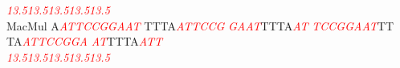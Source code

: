 \documentclass[11pt,twoside,reqno,a4paper]{article}
\begin{document}
{\hspace*{7\charwidth}\hspace*{1\charwidth}\textit{\textcolor{red}{13.5}}\hspace*{1\charwidth}\hspace*{10\charwidth}\textit{\textcolor{red}{13.5}}\hspace*{1\charwidth}\hspace*{10\charwidth}\textit{\textcolor{red}{13.5}}\hspace*{1\charwidth}\hspace*{1\charwidth}\hspace*{10\charwidth}\textit{\textcolor{red}{13.5}}\hspace*{1\charwidth}\hspace*{10\charwidth}\textit{\textcolor{red}{13.5}}\hspace*{1\charwidth}\\
MacMul	A\textit{\textcolor{red}{A}}\textit{\textcolor{red}{T}}\textit{\textcolor{red}{T}}\textit{\textcolor{red}{C}}\textit{\textcolor{red}{C}}\textit{\textcolor{red}{G}}\textit{\textcolor{red}{G}}\textit{\textcolor{red}{A}}\textit{\textcolor{red}{A}}\textit{\textcolor{red}{T}}	TTTA\textit{\textcolor{red}{A}}\textit{\textcolor{red}{T}}\textit{\textcolor{red}{T}}\textit{\textcolor{red}{C}}\textit{\textcolor{red}{C}}\textit{\textcolor{red}{G}}	\textit{\textcolor{red}{G}}\textit{\textcolor{red}{A}}\textit{\textcolor{red}{A}}\textit{\textcolor{red}{T}}TTTA\textit{\textcolor{red}{A}}\textit{\textcolor{red}{T}}	\textit{\textcolor{red}{T}}\textit{\textcolor{red}{C}}\textit{\textcolor{red}{C}}\textit{\textcolor{red}{G}}\textit{\textcolor{red}{G}}\textit{\textcolor{red}{A}}\textit{\textcolor{red}{A}}\textit{\textcolor{red}{T}}TT	TA\textit{\textcolor{red}{A}}\textit{\textcolor{red}{T}}\textit{\textcolor{red}{T}}\textit{\textcolor{red}{C}}\textit{\textcolor{red}{C}}\textit{\textcolor{red}{G}}\textit{\textcolor{red}{G}}\textit{\textcolor{red}{A}}	\textit{\textcolor{red}{A}}\textit{\textcolor{red}{T}}TTTA\textit{\textcolor{red}{A}}\textit{\textcolor{red}{T}}\textit{\textcolor{red}{T}}\\
\hspace*{7\charwidth}\hspace*{1\charwidth}\textit{\textcolor{red}{13.5}}\hspace*{1\charwidth}\hspace*{10\charwidth}\textit{\textcolor{red}{13.5}}\hspace*{1\charwidth}\hspace*{10\charwidth}\textit{\textcolor{red}{13.5}}\hspace*{1\charwidth}\hspace*{1\charwidth}\hspace*{10\charwidth}\textit{\textcolor{red}{13.5}}\hspace*{1\charwidth}\hspace*{10\charwidth}\textit{\textcolor{red}{13.5}}\hspace*{1\charwidth}\\
}
\end{document}

